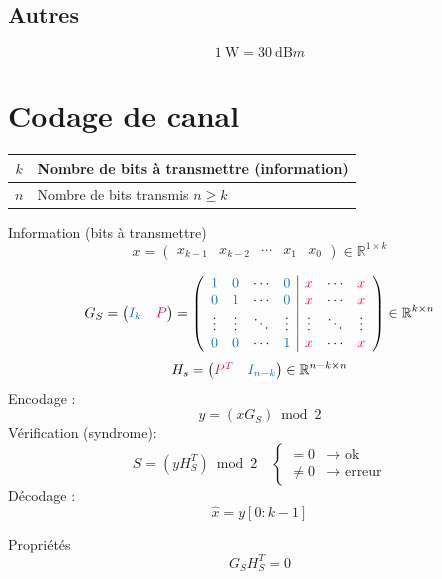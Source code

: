 \documentclass[]{article}
\begin{document}
\begin{multicols}{3}
\subsection{Autres}
$$\SI{1}{\watt}=\SI{30}{\deci\bel m}$$
\section{Codage de canal}
\begin{center}
\begin{tabular}{c|l}
$k$ & Nombre de bits à transmettre (information)\\\hline
$n$ & Nombre de bits transmis $n\geq k$
\end{tabular}
\end{center}
Information (bits à transmettre)
$$x=\begin{pmatrix}
x_{k-1} &
x_{k-2} &
\cdots &
x_1 &
x_0
\end{pmatrix}\in \mathbb{R}^{1\times k}$$

$$G_S=\begin{pmatrix}
\textcolor{RoyalBlue}{I_k} & \textcolor{OrangeRed}{P}
\end{pmatrix}=
\left(\begin{array}{cccc|cccc}
\textcolor{RoyalBlue}{1} & \textcolor{RoyalBlue}{0} & \cdots & \textcolor{RoyalBlue}{0} & \textcolor{OrangeRed}{x} & \cdots & \textcolor{OrangeRed}{x}\\
\textcolor{RoyalBlue}{0} & \textcolor{RoyalBlue}{1} & \cdots & \textcolor{RoyalBlue}{0} & \textcolor{OrangeRed}{x} & \cdots & \textcolor{OrangeRed}{x}\\
\vdots & \vdots & \ddots & \vdots & \vdots & \ddots & \vdots\\
\textcolor{RoyalBlue}{0} & \textcolor{RoyalBlue}{0} & \cdots & \textcolor{RoyalBlue}{1} & \textcolor{OrangeRed}{x} & \cdots & \textcolor{OrangeRed}{x}
\end{array}\right)\in\mathbb{R}^{k\times n}$$
$$H_s=\begin{pmatrix}
\textcolor{OrangeRed}{P^{T}} & \textcolor{RoyalBlue}{I_{n-k}}
\end{pmatrix}\in\mathbb{R}^{n-k\times n}$$
Encodage :
$$y=(xG_S)\bmod 2$$
Vérification (syndrome):
$$S=(yH_S^T)\bmod 2\quad \begin{cases}
=0 &\longrightarrow \text{ ok}\\
\neq 0 & \longrightarrow \text{ erreur}
\end{cases}$$
Décodage :
$$\hat{x}=y[0:k-1]$$


Propriétés
$$G_SH_S^T=0$$





\end{multicols}
\end{document}
